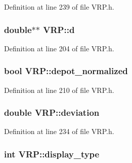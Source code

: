 Definition at line 239 of file VRP.h.

\hypertarget{class_v_r_p_ade83b7d5a9db82ff85e730daa4caac5a}{
\subsubsection[{d}]{\setlength{\rightskip}{0pt plus 5cm}double$\ast$$\ast$ {\bf VRP::d}}}
\label{class_v_r_p_ade83b7d5a9db82ff85e730daa4caac5a}


Definition at line 204 of file VRP.h.

\hypertarget{class_v_r_p_a464f8802b533b943a25e7b47e15e7cd1}{
\subsubsection[{depot\_\-normalized}]{\setlength{\rightskip}{0pt plus 5cm}bool {\bf VRP::depot\_\-normalized}}}
\label{class_v_r_p_a464f8802b533b943a25e7b47e15e7cd1}


Definition at line 210 of file VRP.h.

\hypertarget{class_v_r_p_a1e39d7493e674f4a22f22f21e5d0bd87}{
\subsubsection[{deviation}]{\setlength{\rightskip}{0pt plus 5cm}double {\bf VRP::deviation}}}
\label{class_v_r_p_a1e39d7493e674f4a22f22f21e5d0bd87}


Definition at line 234 of file VRP.h.

\hypertarget{class_v_r_p_a47e17e1b022eac02504a129ba26f28b8}{
\subsubsection[{display\_\-type}]{\setlength{\rightskip}{0pt plus 5cm}int {\bf VRP::display\_\-type}}}
\label{class_v_r_p_a47e17e1b022eac02504a129ba26f28b8}


